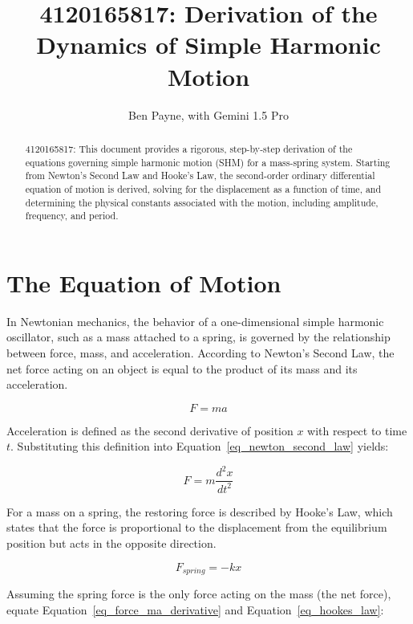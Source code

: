 \documentclass{article}
\author{Ben Payne, with Gemini 1.5 Pro}
\title{4120165817: Derivation of the Dynamics of Simple Harmonic Motion}
\begin{document}
\maketitle
\begin{abstract}
4120165817: This document provides a rigorous, step-by-step derivation of the equations governing simple harmonic motion (SHM) for a mass-spring system. Starting from Newton's Second Law and Hooke's Law,  the second-order ordinary differential equation of motion is derived, solving for the displacement as a function of time, and determining the physical constants associated with the motion, including amplitude, frequency, and period.
\end{abstract}

\section{The Equation of Motion}

In Newtonian mechanics, the behavior of a one-dimensional simple harmonic oscillator, such as a mass attached to a spring, is governed by the relationship between force, mass, and acceleration. According to Newton's Second Law, the net force acting on an object is equal to the product of its mass and its acceleration.

\begin{equation}
F = m a
\label{eq_newton_second_law}
\end{equation}

Acceleration is defined as the second derivative of position $x$ with respect to time $t$. Substituting this definition into Equation~\ref{eq_newton_second_law} yields:

\begin{equation}
F = m \frac{d^2 x}{d t^2}
\label{eq_force_ma_derivative}
\end{equation}

For a mass on a spring, the restoring force is described by Hooke's Law, which states that the force is proportional to the displacement from the equilibrium position but acts in the opposite direction.

\begin{equation}
F_{spring} = -k x
\label{eq_hookes_law}
\end{equation}

Assuming the spring force is the only force acting on the mass (the net force),  equate Equation~\ref{eq_force_ma_derivative} and Equation~\ref{eq_hookes_law}:
\end{document}
